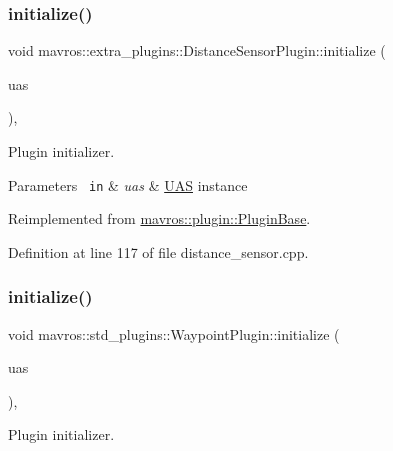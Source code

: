 \subsubsection{\texorpdfstring{initialize()}{initialize()}\hspace{0.1cm}{\footnotesize\ttfamily [36/41]}}
{\footnotesize\ttfamily void mavros\+::extra\+\_\+plugins\+::\+Distance\+Sensor\+Plugin\+::initialize (\begin{DoxyParamCaption}\item[{\mbox{\hyperlink{classmavros_1_1UAS}{U\+AS}} \&}]{uas }\end{DoxyParamCaption})\hspace{0.3cm}{\ttfamily [inline]}, {\ttfamily [virtual]}}



Plugin initializer. 


\begin{DoxyParams}[1]{Parameters}
\mbox{\texttt{ in}}  & {\em uas} & {\ttfamily \mbox{\hyperlink{classmavros_1_1UAS}{U\+AS}}} instance \\
\hline
\end{DoxyParams}


Reimplemented from \mbox{\hyperlink{group__plugin_gad5313a41da4d26acbbabf008cdc21e82}{mavros\+::plugin\+::\+Plugin\+Base}}.



Definition at line 117 of file distance\+\_\+sensor.\+cpp.

\mbox{\label{group__plugin_gaeacb83ea00ebb3446b99f88a573c9a86}} 
\subsubsection{\texorpdfstring{initialize()}{initialize()}\hspace{0.1cm}{\footnotesize\ttfamily [37/41]}}
{\footnotesize\ttfamily void mavros\+::std\+\_\+plugins\+::\+Waypoint\+Plugin\+::initialize (\begin{DoxyParamCaption}\item[{\mbox{\hyperlink{classmavros_1_1UAS}{U\+AS}} \&}]{uas }\end{DoxyParamCaption})\hspace{0.3cm}{\ttfamily [inline]}, {\ttfamily [virtual]}}



Plugin initializer. 



